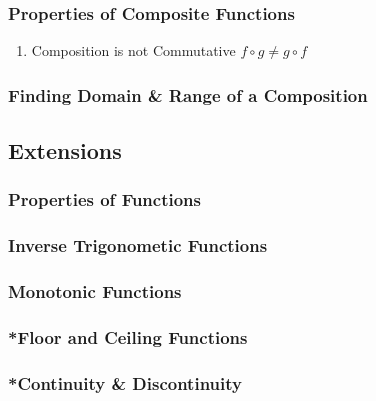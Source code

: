 \documentclass[../main.tex]{subfiles}
\begin{document}
\subsubsection{Properties of Composite Functions}
\begin{enumerate}
    \item Composition is not Commutative \(\displaystyle f \circ g \neq g \circ f\)
\end{enumerate}

\subsubsection{Finding Domain \& Range of a Composition}

\subsection{Extensions}

\subsubsection{Properties of Functions}

\subsubsection{Inverse Trigonometic Functions}

\subsubsection{Monotonic Functions}

\subsubsection{*Floor and Ceiling Functions}

\subsubsection{*Continuity \& Discontinuity}
\end{document}
